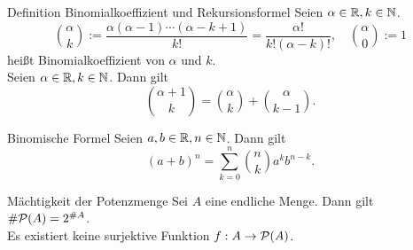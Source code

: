 \documentclass[main.tex]{subfiles}
\begin{document}
\begin{karte}{Definition Binomialkoeffizient und Rekursionsformel}
    Seien \(\alpha \in \mathbb{R}, k \in \mathbb{N} \).
    \[ \binom{\alpha}{k} := 
    \frac{ \alpha(\alpha-1)\cdots(\alpha-k+1) }{k!} = \frac{\alpha!}{k!(\alpha - k)!},
    \quad \binom{\alpha}{0} := 1 \]
    heißt Binomialkoeffizient von \(\alpha \) und \(k \). \\
    Seien \(\alpha \in \mathbb{R}, k \in \mathbb{N} \). Dann gilt
    \[ \binom{\alpha + 1}{k} = \binom{\alpha}{k} 
    + \binom{\alpha}{k-1}. \]
\end{karte}
\begin{karte}{Binomische Formel}
    Seien \(a, b \in \mathbb{R}, n \in \mathbb{N} \). Dann gilt
	\[ {(a+b)}^n = \sum_{k=0}^{n} \binom{n}{k} a^k b^{n-k}. \]
\end{karte}
\begin{karte}{Mächtigkeit der Potenzmenge}
    Sei \(A \) eine endliche Menge. Dann gilt 
    \( \# \mathcal{P}(A) = 2^{\#A} \).\\
    Es existiert keine surjektive Funktion 
    \(f : A \rightarrow \mathcal{P}(A) \).
\end{karte}
\end{document}

